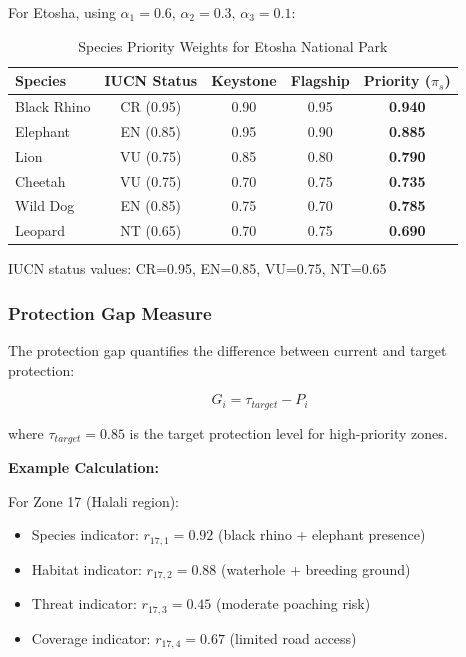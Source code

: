 \noindent For Etosha, using $\alpha_1 = 0.6$, $\alpha_2 = 0.3$, $\alpha_3 = 0.1$:

\begin{table}[h]
\centering
\caption{Species Priority Weights for Etosha National Park}
\begin{tabular}{lcccc}
\hline
\textbf{Species} & \textbf{IUCN Status} & \textbf{Keystone} & \textbf{Flagship} & \textbf{Priority ($\pi_s$)} \\
\hline
Black Rhino & CR (0.95) & 0.90 & 0.95 & \textbf{0.940} \\
Elephant & EN (0.85) & 0.95 & 0.90 & \textbf{0.885} \\
Lion & VU (0.75) & 0.85 & 0.80 & \textbf{0.790} \\
Cheetah & VU (0.75) & 0.70 & 0.75 & \textbf{0.735} \\
Wild Dog & EN (0.85) & 0.75 & 0.70 & \textbf{0.785} \\
Leopard & NT (0.65) & 0.70 & 0.75 & \textbf{0.690} \\
\hline
\end{tabular}
\end{table}

\noindent IUCN status values: CR=0.95, EN=0.85, VU=0.75, NT=0.65

\subsubsection{Protection Gap Measure}

The protection gap quantifies the difference between current and target protection:

\begin{equation}
G_i = \tau_{target} - P_i
\label{eq:protection_gap}
\end{equation}

where $\tau_{target} = 0.85$ is the target protection level for high-priority zones.

\textbf{Example Calculation:}

For Zone 17 (Halali region):
\begin{itemize}
\item Species indicator: $r_{17,1} = 0.92$ (black rhino + elephant presence)
\item Habitat indicator: $r_{17,2} = 0.88$ (waterhole + breeding ground)
\item Threat indicator: $r_{17,3} = 0.45$ (moderate poaching risk)
\item Coverage indicator: $r_{17,4} = 0.67$ (limited road access)
\end{itemize}

